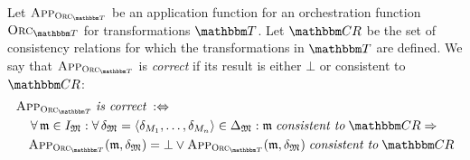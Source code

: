 \begin{definition}
    \label{def:applicationfunctioncorrectness}
    Let $\appfunction{\orcfunction{\transformationset{T}}}$ be an application function for an orchestration function $\orcfunction{\transformationset{T}}$ for transformations $\transformationset{T}$.
    Let $\consistencyrelationset{CR}$ be the set of \glspl{consistency relation} for which the transformations in $\transformationset{T}$ are defined.
    We say that $\appfunction{\orcfunction{\transformationset{T}}}$ is \emph{correct} if its result is either $\bot$ or consistent to $\consistencyrelationset{CR}{}$:
    \begin{align*}
        &
        \appfunction{\orcfunction{\transformationset{T}}} \mathtext{is correct} \equivalentperdefinition \\
        & \formulaskip
        \forall \modeltuple{m} \in \metamodeltupleinstanceset{M} : \forall \changetuple{\metamodeltuple{M}} = \tupled{\change{\metamodel{M}{1}}, \dots, \change{\metamodel{M}{n}}} \in \changeuniverse{\metamodeltuple{M}} :
        \modeltuple{m} \consistenttomath \consistencyrelationset{CR} \Rightarrow \\
        & \formulaskip
        \appfunction{\orcfunction{\transformationset{T}}}(\modeltuple{m}, \changetuple{\metamodeltuple{M}}) = \bot \lor \appfunction{\orcfunction{\transformationset{T}}}(\modeltuple{m}, \changetuple{\metamodeltuple{M}}) \consistenttomath \consistencyrelationset{CR}
    \end{align*}
\end{definition}
